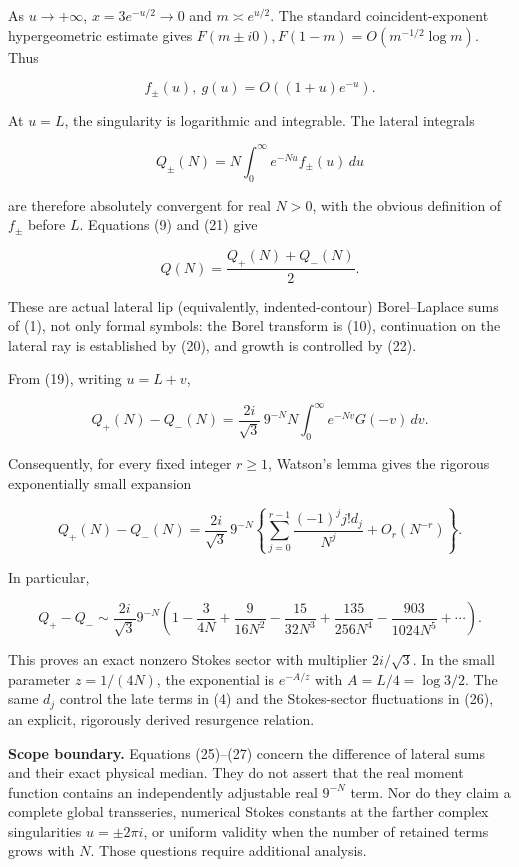 \documentclass[11pt,letterpaper]{article}
\theoremstyle{remark}
\begin{document}
As \(u\to+\infty\), \(x=3e^{-u/2}\to0\) and \(m\asymp e^{u/2}\). The
standard coincident-exponent hypergeometric estimate gives
\(F(m\pm i0),F(1-m)=O(m^{-1/2}\log m)\). Thus

\[
f_\pm(u),\ g(u)=O((1+u)e^{-u}).
\tag{22}
\]

At \(u=L\), the singularity is logarithmic and integrable. The lateral
integrals

\[
Q_\pm(N)=N\int_0^\infty e^{-Nu}f_\pm(u)\,du
\tag{23}
\]

are therefore absolutely convergent for real \(N>0\), with the obvious
definition of \(f_\pm\) before \(L\). Equations (9) and (21) give

\[
\boxed{Q(N)=\frac{Q_+(N)+Q_-(N)}2.}
\tag{24}
\]

These are actual lateral lip (equivalently, indented-contour)
Borel--Laplace sums of (1), not only formal symbols: the Borel transform
is (10), continuation on the lateral ray is established by (20), and
growth is controlled by (22).

From (19), writing \(u=L+v\),

\[
\boxed{\displaystyle
Q_+(N)-Q_-(N)=\frac{2i}{\sqrt3}\,9^{-N}
N\int_0^\infty e^{-Nv}G(-v)\,dv.}
\tag{25}
\]

Consequently, for every fixed integer \(r\ge1\), Watson's lemma gives
the rigorous exponentially small expansion

\[
Q_+(N)-Q_-(N)=\frac{2i}{\sqrt3}\,9^{-N}
\left\{\sum_{j=0}^{r-1}\frac{(-1)^jj!d_j}{N^j}+O_r(N^{-r})\right\}.
\tag{26}
\]

In particular,

\[
Q_+-Q_-\sim\frac{2i}{\sqrt3}9^{-N}
\left(1-\frac3{4N}+\frac9{16N^2}-\frac{15}{32N^3}
+\frac{135}{256N^4}-\frac{903}{1024N^5}+\cdots\right).
\tag{27}
\]

This proves an exact nonzero Stokes sector with multiplier
\(2i/\sqrt3\). In the small parameter \(z=1/(4N)\), the exponential is
\(e^{-A/z}\) with \(A=L/4=\log3/2\). The same \(d_j\) control the late
terms in (4) and the Stokes-sector fluctuations in (26), an explicit,
rigorously derived resurgence relation.

\textbf{Scope boundary.} Equations (25)--(27) concern the difference of
lateral sums and their exact physical median. They do not assert that
the real moment function contains an independently adjustable real
\(9^{-N}\) term. Nor do they claim a complete global transseries,
numerical Stokes constants at the farther complex singularities
\(u=\pm2\pi i\), or uniform validity when the number of retained terms
grows with \(N\). Those questions require additional analysis.
\end{document}
